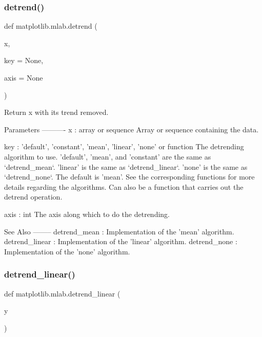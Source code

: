 \subsubsection{\texorpdfstring{detrend()}{detrend()}}
{\footnotesize\ttfamily def matplotlib.\+mlab.\+detrend (\begin{DoxyParamCaption}\item[{}]{x,  }\item[{}]{key = {\ttfamily None},  }\item[{}]{axis = {\ttfamily None} }\end{DoxyParamCaption})}

\begin{DoxyVerb}Return x with its trend removed.

Parameters
----------
x : array or sequence
    Array or sequence containing the data.

key : {'default', 'constant', 'mean', 'linear', 'none'} or function
    The detrending algorithm to use. 'default', 'mean', and 'constant' are
    the same as `detrend_mean`. 'linear' is the same as `detrend_linear`.
    'none' is the same as `detrend_none`. The default is 'mean'. See the
    corresponding functions for more details regarding the algorithms. Can
    also be a function that carries out the detrend operation.

axis : int
    The axis along which to do the detrending.

See Also
--------
detrend_mean : Implementation of the 'mean' algorithm.
detrend_linear : Implementation of the 'linear' algorithm.
detrend_none : Implementation of the 'none' algorithm.
\end{DoxyVerb}
 \mbox{\label{namespacematplotlib_1_1mlab_ad8259a7aec39bab4216763acc518aba2}} 
\subsubsection{\texorpdfstring{detrend\+\_\+linear()}{detrend\_linear()}}
{\footnotesize\ttfamily def matplotlib.\+mlab.\+detrend\+\_\+linear (\begin{DoxyParamCaption}\item[{}]{y }\end{DoxyParamCaption})}

